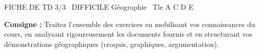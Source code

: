 \documentclass[11pt]{article}
\begin{document}
\begin{tcolorbox}[enhanced,colback=popink,colframe=popink,arc=10pt,boxrule=0pt,left=12pt,right=12pt,top=9pt,bottom=9pt]
{\color{white}\popxbold\small FICHE DE TD 3/3 \textbullet\ DIFFICILE \hfill Géographie \textbullet\ Tle A C D E\par}
\end{tcolorbox}
\vspace{4pt}
\noindent\textbf{Consigne :} Traitez l'ensemble des exercices en mobilisant vos connaissances du cours, en analysant rigoureusement les documents fournis et en structurant vos démonstrations géographiques (croquis, graphiques, argumentation).
\end{document}
